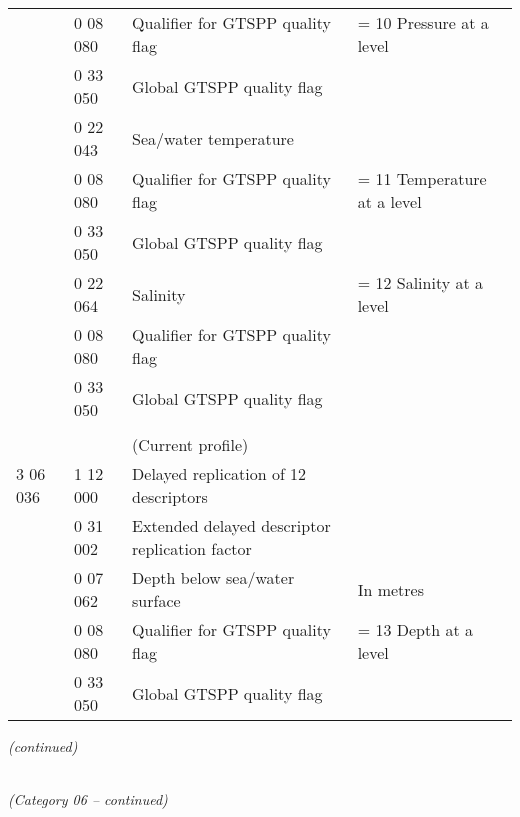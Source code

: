 \begin{longtable}[]{@{}llll@{}}
& 0 08 080 & Qualifier for GTSPP quality flag & = 10 Pressure at a level\tabularnewline
& 0 33 050 & Global GTSPP quality flag &\tabularnewline
& 0 22 043 & Sea/water temperature &\tabularnewline
& 0 08 080 & Qualifier for GTSPP quality flag & = 11 Temperature at a level\tabularnewline
& 0 33 050 & Global GTSPP quality flag &\tabularnewline
& 0 22 064 & Salinity & = 12 Salinity at a level\tabularnewline
& 0 08 080 & Qualifier for GTSPP quality flag &\tabularnewline
& 0 33 050 & Global GTSPP quality flag &\tabularnewline
& & &\tabularnewline
& & (Current profile) &\tabularnewline
3 06 036 & 1 12 000 & Delayed replication of 12 descriptors &\tabularnewline
& 0 31 002 & Extended delayed descriptor replication factor &\tabularnewline
& 0 07 062 & Depth below sea/water surface & In metres\tabularnewline
& 0 08 080 & Qualifier for GTSPP quality flag & = 13 Depth at a level\tabularnewline
& 0 33 050 & Global GTSPP quality flag &\tabularnewline
\bottomrule
\end{longtable}

\emph{(continued)}

\emph{\\
(Category 06 -- continued)}

